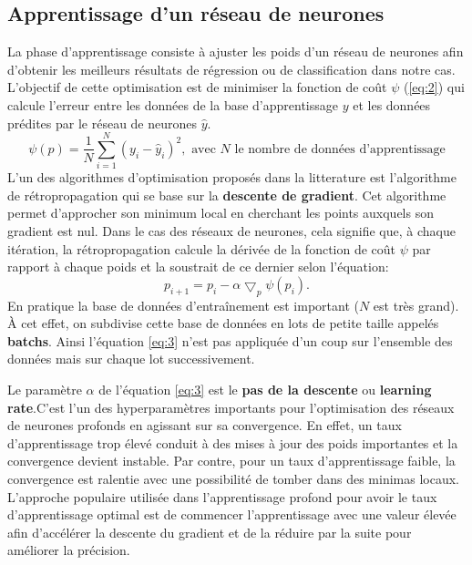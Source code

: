     \subsection{Apprentissage d'un réseau de neurones}
    La phase d’apprentissage consiste à ajuster les poids d’un réseau de neurones afin d’obtenir les meilleurs résultats de régression ou de classification dans notre cas. L’objectif de cette optimisation est de minimiser la fonction de coût $\psi$ (\ref{eq:2}) qui calcule l’erreur entre les données de la base d’apprentissage $y$ et les données prédites par le réseau de neurones $\hat{y}$.
    \begin{equation}\label{eq:2}
        \psi(p) = \frac{1}{N}\sum_{i=1}^{N}(y_{i}-\hat{y}_{i})^{2}, \text{ avec } N \text{ le nombre de données d'apprentissage}
    \end{equation}
    L'un des algorithmes d'optimisation proposés dans la litterature est l’algorithme de rétropropagation qui se base sur la \textbf{descente de gradient}. Cet algorithme permet d’approcher son minimum local en cherchant les points auxquels son gradient est nul. Dans le cas des réseaux de neurones, cela signifie que, à chaque itération, la rétropropagation calcule la dérivée de la fonction de coût $\psi$ par rapport à chaque poids et la soustrait de ce dernier selon l’équation:
    \begin{equation}\label{eq:3}
        p_{i+1} = p_{i} - \alpha\bigtriangledown_{p}\psi(p_{i}).
    \end{equation}
    En pratique la base de données d'entraînement est important ($N$ est très grand). À cet effet, on subdivise cette base de données en lots de petite taille appelés \textbf{batchs}. Ainsi l'équation \ref{eq:3} n'est pas appliquée d'un coup sur l'ensemble des données mais sur chaque lot successivement.
    
    Le paramètre $\alpha$ de l’équation \ref{eq:3} est le \textbf{pas de la descente} ou \textbf{learning rate}.C'est l’un des hyperparamètres importants pour l’optimisation des réseaux de neurones profonds en agissant sur sa convergence. En effet, un taux d’apprentissage trop élevé conduit à des mises à jour des poids importantes et la convergence devient instable. Par contre, pour un taux d’apprentissage faible, la convergence est ralentie avec une possibilité de tomber dans des minimas locaux. L’approche populaire utilisée dans l’apprentissage profond pour avoir le taux d’apprentissage optimal est de commencer l’apprentissage avec une valeur élevée afin d’accélérer la descente du gradient et de la réduire par la suite pour améliorer la précision.\cite{dahmaneThesis}
    
